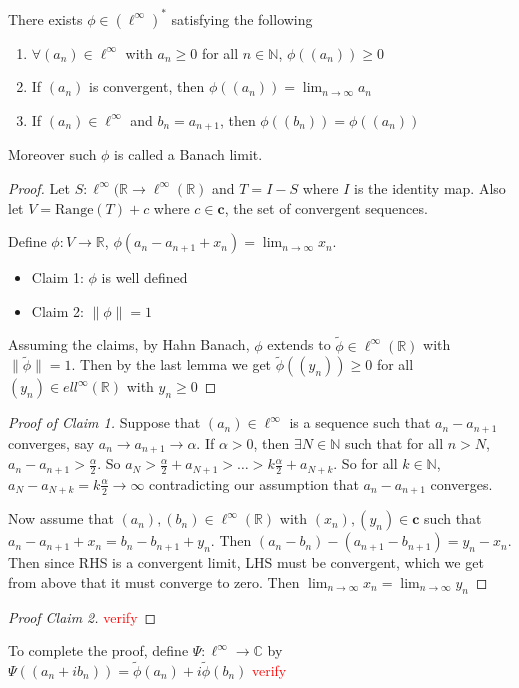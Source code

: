 
\chapter{}

\begin{theorem}
  There exists $\phi \in (\ell^\infty)^{*}$ satisfying the following \begin{enumerate}[label=\arabic*]
    \item $\forall (a_n) \in \ell^\infty$ with $a_n \ge 0$ for all $ n \in \mathbb{N}$, $\phi((a_n)) \ge 0$
    \item If $(a_n)$ is convergent, then $\phi((a_n)) = \lim_{n \to \infty}  a_n$
    \item If $(a_n) \in \ell^\infty$ and $b_n = a_{n+1}$, then $\phi((b_n)) = \phi((a_n))$
  \end{enumerate}
  Moreover such $\phi$ is called a Banach limit.
\end{theorem}
\begin{proof}
  Let $S: \ell^\infty(\mathbb{R} \to \ell^\infty(\mathbb{R})$ and $T = I - S$ where $I$ is the identity map. Also let $V = \textrm{Range}(T) + c$ where $ c \in \textbf{c}$, the set of convergent sequences.

  Define $\phi: V \to \mathbb{R}$, $\phi(a_n - a_{n+1} + x_n) = \lim_{n \to \infty}  x_n$.
  \begin{itemize}[]
    \item Claim 1: $\phi$ is well defined
    \item Claim 2: $\|\phi\| = 1$
  \end{itemize}

  Assuming the claims, by Hahn Banach, $\phi$ extends to $\tilde{ \phi} \in \ell^\infty(\mathbb{R})$ with $\|\tilde{\phi}\|= 1$. Then by the last lemma we get $ \tilde{\phi}((y_n)) \ge 0$ for all $(y_n) \in ell^\infty(\mathbb{R})$ with $y_n \ge 0$
\end{proof}
 \begin{proof}[Proof of Claim 1]
   Suppose that $(a_n) \in \ell^\infty$ is a sequence such that $a_{n} - a_{n+1}$ converges, say $a_n \to a_{n+1} \to \alpha$. If $ \alpha > 0$, then $\exists N \in \mathbb{N}$ such that for all $n > N$, $ a_n - a_{n+1} > \frac{\alpha}{2}$. So $a_N > \frac{\alpha}{2} + a_{N+1} > \ldots > k\frac{\alpha}{2} + a_{N+k}$. So for all $k \in \mathbb{N}$, $a_N - a_{N+k} = k \frac{\alpha}{2} \to \infty$ contradicting our assumption that $a_n - a_{n+1}$ converges. 

   Now assume that $(a_n), ( b_n) \in \ell^\infty(\mathbb{R})$ with $(x_n), (y_n) \in \textbf{c}$ such that $a_n - a_{n+1} + x_n = b_n - b_{n+1} + y_n$. Then $(a_n - b_n) - (a_{ n+1} - b_{n+1}) = y_n -x_n$. Then since  RHS is a convergent limit, LHS must be convergent, which we get from above that it must converge to zero. Then $\lim_{n \to \infty} x_n = \lim_{n \to \infty} y_n$
 \end{proof}
\begin{proof}[Proof Claim 2]
   \textcolor{red}{verify}
\end{proof}
To complete the proof, define $ \Psi: \ell^\infty \to \mathbb{C}$ by $\Psi((a_n + ib_n)) = \tilde{\phi}(a_n) + i \tilde{ \phi}(b_n)$ \textcolor{red}{verify}

